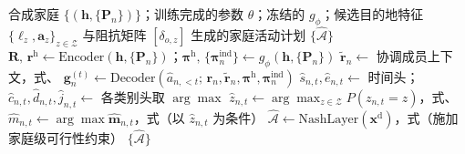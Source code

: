 \begin{algorithm}[H]
\caption{CoHACT 家庭活动计划生成（推理）流程}\label{alg.cohact.generation}
\begin{algorithmic}[1]
\REQUIRE 合成家庭 $\{(\mathbf{h},\{\mathbf{P}_n\})\}$；训练完成的参数 $\theta$；冻结的 $g_\phi$；候选目的地特征 $\{\boldsymbol{\ell}_z,\mathbf{a}_z\}_{z\in\mathcal{Z}}$ 与阻抗矩阵 $[\delta_{o,z}]$
\ENSURE 生成的家庭活动计划 $\{\hat{\mathcal{A}}\}$
  \STATE $\mathbf{R},\,\mathbf{r}^{\mathrm{h}}\leftarrow\mathrm{Encoder}(\mathbf{h},\{\mathbf{P}_n\})$；\quad $\boldsymbol{\pi}^{\mathrm{h}},\,\{\boldsymbol{\pi}_n^{\mathrm{ind}}\}\leftarrow g_\phi(\mathbf{h},\{\mathbf{P}_n\})$
  \STATE $\tilde{\mathbf{r}}_n\leftarrow$ 协调成员上下文，式、
    \STATE $\mathbf{g}_n^{(t)}\leftarrow\mathrm{Decoder}(\hat{a}_{n,<t};\,\mathbf{r}_n,\tilde{\mathbf{r}}_n,\boldsymbol{\pi}^{\mathrm{h}},\boldsymbol{\pi}_n^{\mathrm{ind}})$
    \STATE $\hat{s}_{n,t},\hat{e}_{n,t}\leftarrow$ 时间头；\quad $\hat{c}_{n,t},\hat{d}_{n,t},\hat{j}_{n,t}\leftarrow$ 各类别头取 $\arg\max$
    \STATE $\hat{z}_{n,t}\leftarrow\arg\max_{z\in\mathcal{Z}}P(z_{n,t}=z)$，式、
    \STATE $\hat{m}_{n,t}\leftarrow\arg\max\hat{\mathbf{m}}_{n,t}$，式（以 $\hat{z}_{n,t}$ 为条件）
  \ENDFOR
  \STATE $\hat{\mathcal{A}}\leftarrow\mathrm{NashLayer}(\mathbf{x}^{\mathrm{d}})$，式（施加家庭级可行性约束）
\ENDFOR
\RETURN $\{\hat{\mathcal{A}}\}$
\end{algorithmic}
\end{algorithm}

\indent
{}
